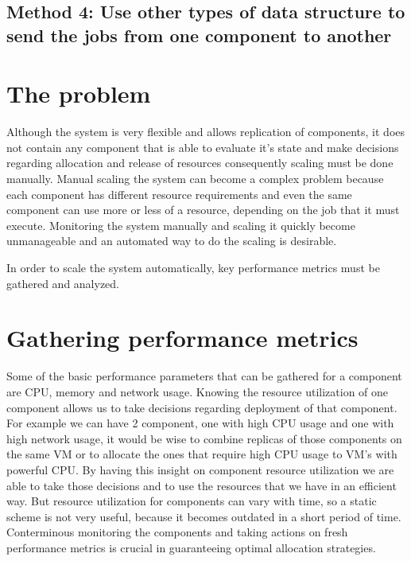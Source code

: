\documentclass[fleqn,10pt]{./class/wlscirep}
\begin{document}
\subsection{Method 4: Use other types of data structure to send the jobs from one component to another}

\section{The problem}
Although the system is very flexible and allows replication of components, it does not contain any component that is able to evaluate it's state and make decisions regarding allocation and release of resources consequently scaling must be done manually. Manual scaling the system can become a complex problem because each component has different resource requirements and even the same component can use more or less of a resource, depending on the job that it must execute. Monitoring the system manually and scaling it quickly become unmanageable and an automated way to do the scaling is desirable. 

In order to scale the system automatically, key performance metrics must be gathered and analyzed. 

\section{Gathering performance metrics}
Some of the basic performance parameters that can be gathered for a component are CPU, memory and network usage. Knowing the resource utilization of one component allows us to take decisions regarding deployment of that component. For example we can have 2 component, one with high CPU usage and one with high network usage, it would be wise to combine replicas of those components on the same VM or to allocate the ones that require high CPU usage to VM's with powerful CPU. By having this insight on component resource utilization we are able to take those decisions and to use the resources that we have in an efficient way. But resource utilization for components can vary with time, so a static scheme is not very useful, because it becomes outdated in a short period of time. Conterminous monitoring the components and taking actions on fresh performance metrics is crucial in guaranteeing optimal allocation strategies.
\end{document}
